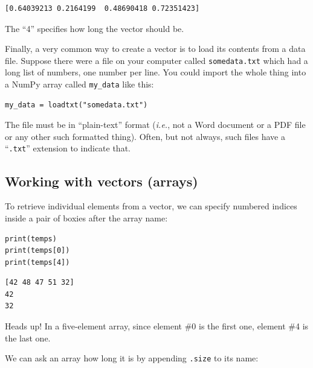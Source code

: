 \begin{Verbatim}[fontsize=\small,samepage=true,frame=leftline,framesep=5mm,framerule=1mm]
[0.64039213 0.2164199  0.48690418 0.72351423]
\end{Verbatim}

The ``4'' specifies how long the vector should be.


Finally, a very common way to create a vector is to load its contents from a
data file. Suppose there were a file on your computer called
\texttt{somedata.txt} which had a long list of numbers, one number per line.
You could import the whole thing into a NumPy array called \texttt{my\_data}
like this:

\begin{Verbatim}[fontsize=\small,samepage=true,frame=single,framesep=3mm]
my_data = loadtxt("somedata.txt")
\end{Verbatim}


The file must be in ``plain-text'' format (\textit{i.e.}, not a Word document
or a PDF file or any other such formatted thing). Often, but not always, such
files have a ``\texttt{.txt}'' extension to indicate that.


\subsection*{Working with vectors (arrays)}

To retrieve individual elements from a vector, we can specify numbered indices
inside a pair of boxies after the array name:

\begin{Verbatim}[fontsize=\small,samepage=true,frame=single,framesep=3mm]
print(temps)
print(temps[0])
print(temps[4])
\end{Verbatim}

\vspace{-.2in}
\begin{Verbatim}[fontsize=\small,samepage=true,frame=leftline,framesep=5mm,framerule=1mm]
[42 48 47 51 32]
42
32
\end{Verbatim}

Heads up! In a five-element array, since element \#0 is the first one, element
\#4 is the last one.

We can ask an array how long it is by appending \texttt{.size} to its name:

